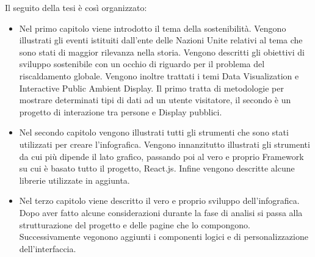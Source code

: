 \noindent Il seguito della tesi è così organizzato:
\begin{itemize}
    \item Nel primo capitolo viene introdotto il tema della sostenibilità. Vengono illustrati gli eventi istituiti dall'ente delle Nazioni Unite relativi al tema che sono stati di maggior rilevanza nella storia. Vengono descritti gli obiettivi di sviluppo sostenibile con un occhio di riguardo per il problema del riscaldamento globale.
    Vengono inoltre trattati i temi Data Visualization e  Interactive Public Ambient Display. Il primo tratta di metodologie per mostrare determinati tipi di dati ad un utente visitatore, il secondo è un progetto di interazione tra persone e Display pubblici.
    \item Nel secondo capitolo vengono illustrati tutti gli strumenti che sono stati utilizzati per creare l'infografica.
    Vengono innanzitutto illustrati gli strumenti da cui più dipende il lato grafico, passando poi al vero e proprio Framework su cui è basato tutto il progetto, React.js. Infine vengono descritte alcune librerie utilizzate in aggiunta.
    \item Nel terzo capitolo viene descritto il vero e proprio sviluppo dell'infografica. Dopo aver fatto alcune considerazioni durante la fase di analisi si passa alla strutturazione del progetto e delle pagine che lo compongono. Successivamente vegonono aggiunti i componenti logici e di personalizzazione dell'interfaccia.
\end{itemize}

\clearpage{\pagestyle{empty}\cleardoublepage}